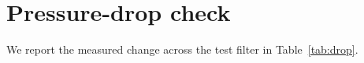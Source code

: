 \documentclass{article}
\begin{document}
\section{Pressure-drop check}
We report the measured change across the test filter in Table~\ref{tab:drop}.

\end{document}
